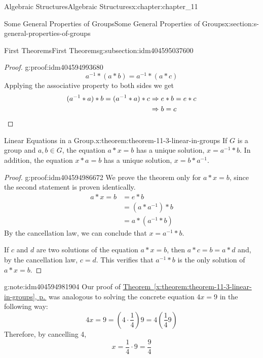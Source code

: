\documentclass[twoside,10pt,]{book}
\newcommand{\xreffont}{\relax}
\newcommand{\qedhere}{\relax}
\numberwithin{equation}{section}
\begin{document}
\begin{chapterptx}{Algebraic Structures}{}{Algebraic Structures}{}{}{x:chapter:chapter_11}
\begin{sectionptx}{Some General Properties of Groups}{}{Some General Properties of Groups}{}{}{x:section:s-general-properties-of-groups}
\begin{subsectionptx}{First Theorems}{}{First Theorems}{}{}{g:subsection:idm404595037600}
\begin{proof}{}{g:proof:idm404594993680}
\begin{equation*}
a^{-1}* (a * b) = a^{-1} * (a * c)
\end{equation*}
Applying the associative property to both sides we get%
\begin{equation*}
\begin{split}
(a^{-1} * a) * b = (a^{-1} * a) * c &  \Rightarrow e * b = e * c\\
& \Rightarrow  b = c
\end{split}\qedhere
\end{equation*}
%
\end{proof}
\begin{theorem}{Linear Equations in a Group.}{}{x:theorem:theorem-11-3-linear-in-groups}%
%
If \(G\) is a group and \(a, b \in  G\), the equation \(a * x = b\) has a unique solution, \(x
= a^{-1} * b\).  In addition, the equation \(x * a = b\) has a unique solution, \(x = b * a^{-1}\).%
\end{theorem}
\begin{proof}{}{g:proof:idm404594986672}
We prove the theorem only for \(a * x = b\), since the second statement is proven identically.%
\begin{equation*}
\begin{split}
a*x = b & =e * b\\
&= (a* a^{-1}) * b \\
& = a * (a^{-1} * b)
\end{split}
\end{equation*}
By the cancellation law, we can conclude that \(x = a ^{-1} * b\).%
\par
If \(c\) and \(d\) are two solutions of the equation \(a * x = b\), then \(a * c = b = a * d\) and, by the cancellation law, \(c = d\).  This verifies that \(a ^{-1} * b\) is the only solution of \(a * x = b\).%
\end{proof}
\begin{note}{}{g:note:idm404594981904}%
Our proof of \hyperref[x:theorem:theorem-11-3-linear-in-groups]{Theorem~{\xreffont\ref{x:theorem:theorem-11-3-linear-in-groups}}, p.\,\pageref{x:theorem:theorem-11-3-linear-in-groups}} was analogous to solving the concrete equation \(4x = 9\) in the following way:%
\begin{equation*}
4 x=9=\left(4\cdot \frac{1}{4}\right)9=4\left(\frac{1}{4}9\right)
\end{equation*}
Therefore, by cancelling 4,%
\begin{equation*}
x = \frac{1}{4}\cdot  9 = \frac{9}{4}
\end{equation*}

\end{note}
\end{subsectionptx}
\end{sectionptx}
\end{chapterptx}
\end{document}

